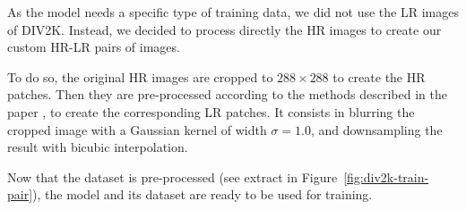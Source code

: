 \documentclass{article}
\begin{document}
{    \bigskip

    As the model needs a specific type of training data, we did not use the LR images of DIV2K. Instead, we decided to process directly the HR images to create our custom HR-LR pairs of images.

    To do so, the original HR images are cropped to $288 \times 288$ to create the HR patches. Then they are pre-processed according to the methods described in the paper \citep{sr}, to create the corresponding LR patches. It consists in blurring the cropped image with a Gaussian kernel of width $\sigma = 1.0$, and downsampling the result with bicubic interpolation.

    Now that the dataset is pre-processed (see extract in Figure~\ref{fig:div2k-train-pair}), the model and its dataset are ready to be used for training.

}
\end{document}
